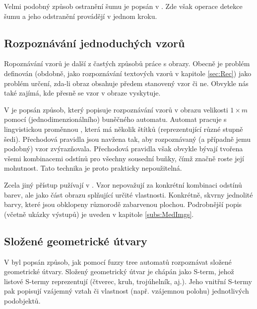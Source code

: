 \documentclass[a4paper,10pt]{article}
\begin{document}
Velmi podobný způsob ostranění šumu je popsán v \cite{SahUguSah-SalPepNoiFilFuzCelAut}. Zde však operace detekce šumu a jeho odstranění provádějí v jednom kroku.

\subsection{Rozpoznávání jednoduchých vzorů}

Ropoznávání vzorů je další z častých způsobů práce s obrazy. Obecně je problém definován (obdobně, jako rozpoznávání textových vzorů v kapitole \ref{sec:Rec}) jako problém určení, zda-li obraz obsahuje předem stanovený vzor či ne. Obvykle nás také zajímá, kde přesně se vzor v obraze vyskytuje.

V \cite{MajCha-FuzCelAutModPatClas} je popsán způsob, který popisuje rozpoznávání vzorů v obrazu velikosti $1 \times m$ pomocí (jednodimenzionálního) buněčného automatu. Automat pracuje s lingvistickou proměnnou , která má několik štítků (reprezentující různé stupně šedi). Přechodová pravidla jsou navžena tak, aby rozpoznávaný (a případně jemu podobný) vzor zvýrazňovala. Přechodová pravidla však obvykle bývají tvořena všemi kombinacemi odstínů pro všechny sousední buňky, čímž značně roste její mohutnost. Tato technika je proto prakticky nepoužitelná.

Zcela jiný přístup pužívají v \cite{WanJiaZhoDu-ImProcBasFuzCelAuMod}. Vzor nepovažují za konkrétní kombinaci odstínů barev, ale jako část obrazu splňující určité vlastnosti. Konkrétně, skvrny jednolité barvy, které jsou obklopeny různorodě zabarvenou plochou. Podrobnější popis (včetně ukázky výstupů) je uveden v kapitole \ref{subs:MedImgs}.

\subsection{Složené geometrické útvary} \label{subs:CompGeoms}

V \cite{Lee-FuzTreAutSynPatRec} byl popsán způsob, jak pomocí fuzzy tree automatů rozpoznávat složené geometrické útvary. Složený geometrický útvar je chápán jako S-term, jehož listové S-termy reprezentují  (čtverec, kruh, trojúhelník, aj.). Jeho vnitřní S-termy pak popisují vzájemný vztah či vlastnost (např. vzájemnou polohu) jednotlivých podobjektů.
\end{document}
